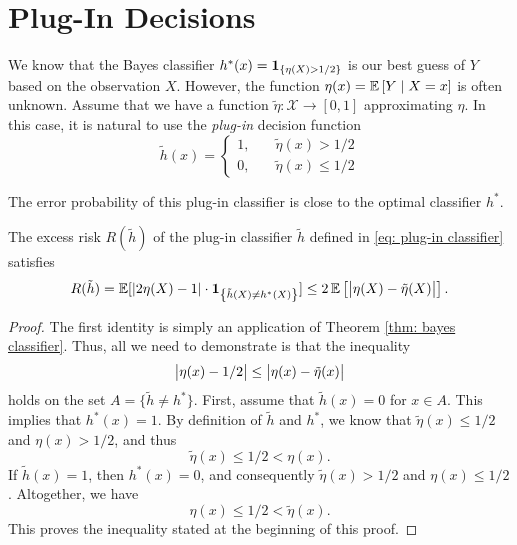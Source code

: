 \section{Plug-In Decisions}
\label{subsec: plug-in decisions}

We know that the Bayes classifier $h^*(x) = \mathbf{1}_{\left\{\eta(X) > 1/2\right\}}$ is our best guess of $Y$ based on the observation $X$. However, the function $\eta(x) = \mathbb{E}\left[Y \mathrel{|} X=x\right]$ is often unknown. Assume that we have a function $\tilde\eta \colon \mathcal{X} \to [0, 1]$ approximating $\eta$. In this case, it is natural to use the \emph{plug-in} decision function
\begin{equation}
\label{eq: plug-in classifier}
    \tilde h(x) = \begin{cases}
        1, \quad &\tilde\eta(x) > 1/2 \\
        0, \quad &\tilde\eta(x) \leq 1/2
    \end{cases}
\end{equation}

The error probability of this plug-in classifier is close to the optimal classifier $h^*$.

\begin{theorem}
\label{thm: plug-in decision}
The excess risk $R(\tilde h)$ of the plug-in classifier $\tilde h$ defined in \eqref{eq: plug-in classifier} satisfies
\[
    R(\tilde h) = \mathbb{E}[\abs{2 \eta(X) - 1} \cdot \mathbf{1}_{\left\{\tilde h(X) \neq h^*(X)\right\}}] \leq 2 \, \mathbb{E}\left[\big\lvert \eta(X) - \tilde\eta(X) \big\rvert\right].
\]
\end{theorem}

\begin{proof}
The first identity is simply an application of Theorem \ref{thm: bayes classifier}. Thus, all we need to demonstrate is that the inequality
\[
    \big\lvert \eta(x) - 1/2 \big\rvert \leq \big\lvert \eta(x) - \tilde\eta(x) \big\rvert
\]
holds on the set $A = \{\tilde h \neq h^*\}$. First, assume that $\tilde h(x) = 0$ for $x \in A$. This implies that $h^*(x) = 1$. By definition of $\tilde h$ and $h^*$, we know that $\tilde\eta(x) \leq 1/2$ and $\eta(x) > 1/2$, and thus
\[
    \tilde\eta(x) \leq 1/2 < \eta(x).
\]
If $\tilde h(x) = 1$, then $h^*(x) = 0$, and consequently $\tilde\eta(x) > 1/2$ and $\eta(x) \leq 1/2$. Altogether, we have
\[
    \eta(x) \leq 1/2 < \tilde\eta(x).
\]
This proves the inequality stated at the beginning of this proof.
\end{proof}

